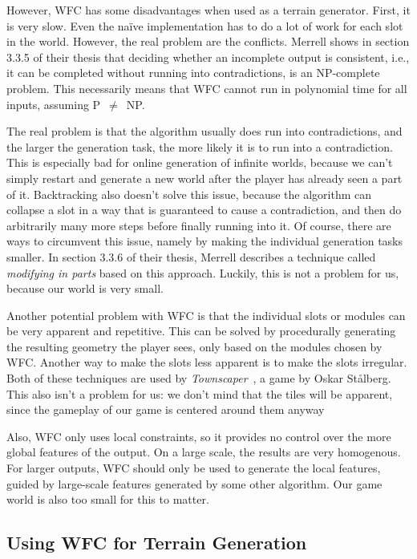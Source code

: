 However, WFC has some disadvantages when used as a terrain generator.
First, it is very slow.
Even the na\"{i}ve implementation has to do a lot of work for each slot in the world.
However, the real problem are the conflicts.
Merrell shows in section 3.3.5 of their thesis that deciding whether an incomplete output is consistent, i.e., it can be completed without running into contradictions, is an NP-complete problem.
This necessarily means that WFC cannot run in polynomial time for all inputs, assuming P~$\neq$~NP.

The real problem is that the algorithm usually does run into contradictions, and the larger the generation task, the more likely it is to run into a contradiction.
This is especially bad for online generation of infinite worlds, because we can't simply restart and generate a new world after the player has already seen a part of it.
Backtracking also doesn't solve this issue, because the algorithm can collapse a slot in a way that is guaranteed to cause a contradiction, and then do arbitrarily many more steps before finally running into it.
Of course, there are ways to circumvent this issue, namely by making the individual generation tasks smaller.
In section 3.3.6 of their thesis, Merrell describes a technique called \emph{modifying in parts} based on this approach.
Luckily, this is not a problem for us, because our world is very small.

Another potential problem with WFC is that the individual slots or modules can be very apparent and repetitive.
This can be solved by procedurally generating the resulting geometry the player sees, only based on the modules chosen by WFC.
Another way to make the slots less apparent is to make the slots irregular.
Both of these techniques are used by \emph{Townscaper}~\cite{Townscaper}, a game by Oskar St\r{a}lberg.
This also isn't a problem for us: we don't mind that the tiles will be apparent, since the gameplay of our game is centered around them anyway

Also, WFC only uses local constraints, so it provides no control over the more global features of the output.
On a large scale, the results are very homogenous.
For larger outputs, WFC should only be used to generate the local features, guided by large-scale features generated by some other algorithm.
Our game world is also too small for this to matter.

\subsection{Using WFC for Terrain Generation}\label{sec:analysis-our-wfc}


